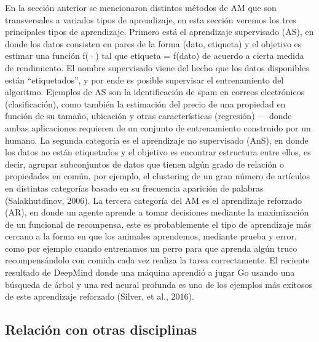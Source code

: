 En la sección anterior se mencionaron distintos métodos de AM que son transversales a variados tipos de aprendizaje, en esta sección veremos los tres principales tipos de aprendizaje. Primero está el aprendizaje supervisado (AS), en donde los datos consisten en pares de la forma (dato, etiqueta) y el objetivo es estimar una función f(·) tal que etiqueta = f(dato) de acuerdo a cierta medida de rendimiento. El nombre supervisado viene del hecho que los datos disponibles están “etiquetados”, y por ende es posible supervisar el entrenamiento del algoritmo. Ejemplos de AS son la identificación de spam en  correos electrónicos (clasificación), como también la estimación del precio de una propiedad en función de su tamaño, ubicación y otras características (regresión) --- donde ambas aplicaciones requieren de un conjunto de entrenamiento construido por un humano. La segunda categoría es el aprendizaje no supervisado (AnS), en donde los datos no están etiquetados y el objetivo es encontrar estructura entre ellos, es decir, agrupar subconjuntos de datos que tienen algún grado de relación o propiedades en común, por ejemplo, el clustering de un gran número de artículos en distintas categorías basado en su frecuencia aparición de palabras (Salakhutdinov, 2006). La tercera categoría del AM es el aprendizaje reforzado (AR), en donde un agente aprende a tomar decisiones mediante la maximización de un funcional de recompensa, este es probablemente el tipo de aprendizaje más cercano a la forma en que los animales aprendemos, mediante prueba y error, como por ejemplo cuando entrenamos un perro para que aprenda algún truco recompensándolo con comida cada vez realiza la tarea correctamente. El reciente resultado de DeepMind donde una máquina aprendió a jugar Go usando una búsqueda de árbol y una red neural profunda es uno de los ejemplos más exitosos de este aprendizaje reforzado (Silver, et al., 2016). 


\subsection{Relación con otras disciplinas}


